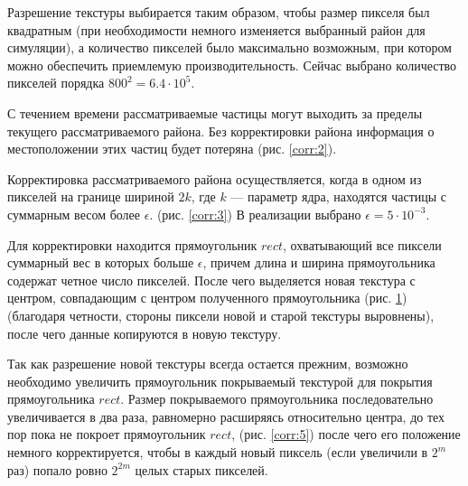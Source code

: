 Разрешение текстуры выбирается таким образом, чтобы размер пикселя был квадратным
(при необходимости немного изменяется выбранный район для симуляции), а количество пикселей
было максимально возможным, при котором можно обеспечить приемлемую производительность.
Сейчас выбрано количество пикселей порядка $800^2 = 6.4 \cdot 10^5$.

С течением времени рассматриваемые частицы могут выходить за пределы текущего рассматриваемого
района. Без корректировки района информация о местоположении этих частиц будет потеряна
(рис. \ref{corr:2}).

\begin{figure}[ht]
  \centering
\begin{minipage}[t]{.48\textwidth}
  \centering
  \label{corr:3}
\end{minipage}
\begin{minipage}[t]{.48\textwidth}
  \centering
  \label{corr:4}
\end{minipage}
\end{figure}

Корректировка рассматриваемого района осуществляется, когда в одном из пикселей на границе
шириной $2k$, где $k$ --- параметр ядра, находятся частицы с суммарным весом более $\epsilon$.
(рис. \ref{corr:3}) В реализации выбрано $\epsilon = 5 \cdot 10^{-3}$.

Для корректировки находится прямоугольник $rect$, охватывающий все пиксели суммарный вес в которых
больше $\epsilon$, причем длина и ширина прямоугольника содержат четное число пикселей.
После чего выделяется новая текстура с центром, совпадающим с центром полученного прямоугольника
(рис. \ref{corr:4}) (благодаря четности, стороны пиксели новой и старой текстуры выровнены), 
после чего данные копируются в новую текстуру.

Так как разрешение новой текстуры всегда остается прежним, возможно необходимо увеличить
прямоугольник покрываемый текстурой для покрытия прямоугольника $rect$. Размер покрываемого
прямоугольника последовательно увеличивается в два раза, равномерно расширяясь относительно центра,
до тех пор пока не покроет прямоугольник $rect$, (рис. \ref{corr:5}) после чего его положение
немного корректируется, чтобы в каждый новый пиксель (если увеличили в $2^m$ раз) попало ровно
$2^{2m}$ целых старых пикселей.

